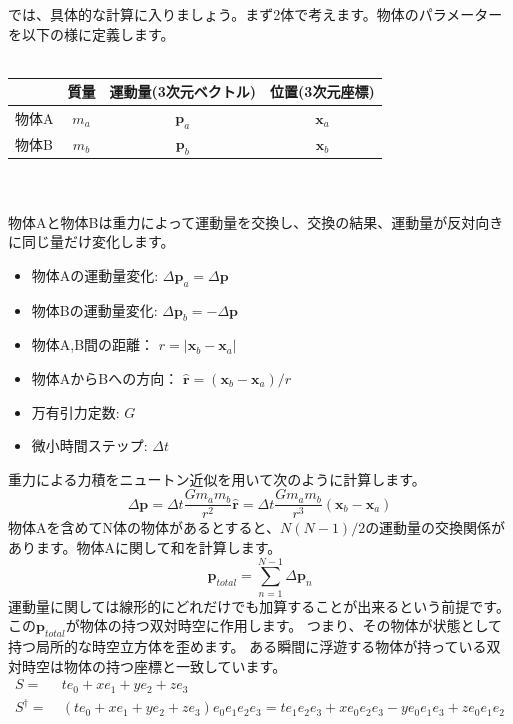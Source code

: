 \documentclass[a4paper,12pt,notitlepage]{jsreport}
\begin{document}
では、具体的な計算に入りましょう。まず2体で考えます。物体のパラメーターを以下の様に定義します。
\\\\
\begin{tabular}{|l|c|c|c|} \hline
  & 質量 & 運動量(3次元ベクトル) & 位置(3次元座標) \\ \hline
  物体A & $ m_a $ & $ \bm{p}_a $ & $ \bm{x}_a $ \\ \hline
  物体B & $ m_b $ & $ \bm{p}_b $ & $ \bm{x}_b $ \\ \hline
\end{tabular}
\\\\
物体Aと物体Bは重力によって運動量を交換し、交換の結果、運動量が反対向きに同じ量だけ変化します。
\begin{itemize}
  \item 物体Aの運動量変化: $ \Delta \bm{p}_a = \Delta \bm{p} $
  \item 物体Bの運動量変化: $ \Delta \bm{p}_b = - \Delta \bm{p} $
  \item 物体A,B間の距離： $ r = |\bm{x}_b - \bm{x}_a| $
  \item 物体AからBへの方向： $ \hat{\bm{r}} = (\bm{x}_b - \bm{x}_a) / r $
  \item 万有引力定数: $G$
  \item 微小時間ステップ: $\Delta t$
\end{itemize}
重力による力積をニュートン近似を用いて次のように計算します。
\begin{equation}
  \Delta \bm{p} = \Delta t \frac{G m_a m_b}{r^2} \hat{\bm{r}} = \Delta t \frac{G m_a m_b}{r^3} (\bm{x}_b - \bm{x}_a)
\end{equation}
物体Aを含めてN体の物体があるとすると、$ N(N - 1) / 2 $の運動量の交換関係があります。物体Aに関して和を計算します。
\begin{equation}
  \bm{p}_{total} = \sum_{n = 1}^{N - 1} \Delta \bm{p}_n
\end{equation}
運動量に関しては線形的にどれだけでも加算することが出来るという前提です。
この$ \bm{p}_{total} $が物体の持つ双対時空に作用します。
つまり、その物体が状態として持つ局所的な時空立方体を歪めます。
ある瞬間に浮遊する物体が持っている双対時空は物体の持つ座標と一致しています。
\begin{equation}
  \begin{split}
    S = ~ & t e_0 + x e_1 + y e_2 + z e_3 \\
    S^\dag = ~ & (t e_0 + x e_1 + y e_2 + z e_3)e_0e_1e_2e_3 
    = t e_1e_2e_3 + x e_0e_2e_3 - y e_0e_1e_3 + z e_0e_1e_2 \\
  \end{split}
\end{equation}
\end{document}
